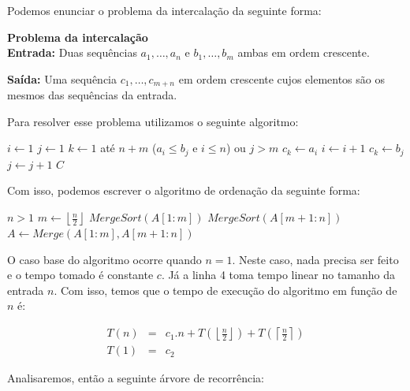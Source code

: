 Podemos enunciar o problema da intercalação da seguinte forma:
\vspace{1em}

{\bf Problema da intercalação}\\

{\bf Entrada:} Duas sequências $a_1, \dots, a_n$ e $b_1, \dots, b_m$ ambas em ordem crescente.

{\bf Saída:} Uma sequência $c_1, \dots, c_{m+n}$ em ordem crescente cujos elementos são os mesmos das sequências da entrada.

Para resolver esse problema utilizamos o seguinte algoritmo:

\begin{codebox}
  \li $i \gets 1$
  \li $j \gets 1$
  \li \For $k \gets 1$ até $n+m$
  \li \Do \If ($a_i \leq b_j$ e $i \leq n$) ou $j > m$
  \li \Then $c_k \gets a_i$
  \li $i \gets i + 1$
  \li \Else
  \li $c_k \gets b_j$
  \li $j \gets j + 1$
  \End
  \End
  \li \Return $C$
\end{codebox}

Com isso, podemos escrever o algoritmo de ordenação da seguinte forma:

\begin{codebox}
  \li \If $n > 1$
  \li \Then  $m \gets \left \lfloor{\frac{n}{2}}\right\rfloor$
  \li $MergeSort(A[1:m])$
  \li $MergeSort(A[m+1:n])$
  \li $A \gets Merge(A[1:m], A[m+1:n])$
\end{codebox}

O caso base do algoritmo ocorre quando $n = 1$.
Neste caso, nada precisa ser feito e o tempo tomado é constante $c$.
Já a linha 4 toma tempo linear no tamanho da entrada $n$.
Com isso, temos que o tempo de execução do algoritmo em função de $n$ é:

\begin{eqnarray*}
  T(n) & = & c_1.n + T(\left \lfloor{\frac{n}{2}}\right\rfloor) + T(\left \lceil{\frac{n}{2}}\right\rceil)\\
  T(1) & = & c_2
\end{eqnarray*}

Analisaremos, então a seguinte árvore de recorrência:

